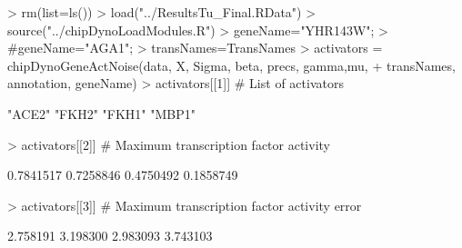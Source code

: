 \documentclass[11pt, a4paper, oneside]{article}
\begin{document}
\begin{Schunk}
\begin{Sinput}
> rm(list=ls())
> load("../ResultsTu_Final.RData")
> source("../chipDynoLoadModules.R")
> geneName="YHR143W"; 
> #geneName="AGA1"; 
> transNames=TransNames
> activators = chipDynoGeneActNoise(data, X, Sigma, beta, precs, gamma,mu, 
+                     transNames, annotation, geneName)
> activators[[1]] # List of activators
\end{Sinput}
\begin{Soutput}
[1] "ACE2" "FKH2" "FKH1" "MBP1"
\end{Soutput}
\begin{Sinput}
> activators[[2]] # Maximum transcription factor activity
\end{Sinput}
\begin{Soutput}
[1] 0.7841517 0.7258846 0.4750492 0.1858749
\end{Soutput}
\begin{Sinput}
> activators[[3]] # Maximum transcription factor activity error
\end{Sinput}
\begin{Soutput}
[1] 2.758191 3.198300 2.983093 3.743103
\end{Soutput}
\end{Schunk}






\end{document}
